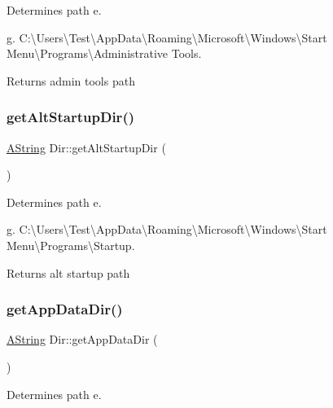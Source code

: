 Determines path e. 

g. C\+:\textbackslash{}\+Users\textbackslash{}\+Test\textbackslash{}\+App\+Data\textbackslash{}\+Roaming\textbackslash{}\+Microsoft\textbackslash{}\+Windows\textbackslash{}\+Start Menu\textbackslash{}\+Programs\textbackslash{}\+Administrative Tools. \begin{DoxyReturn}{Returns}
admin tools path 
\end{DoxyReturn}
\mbox{\label{class_dir_a276a003ff4fb51eb00d854321bd67847}} 
\subsubsection{\texorpdfstring{getAltStartupDir()}{getAltStartupDir()}}
{\footnotesize\ttfamily \mbox{\hyperlink{class_a_string}{A\+String}} Dir\+::get\+Alt\+Startup\+Dir (\begin{DoxyParamCaption}{ }\end{DoxyParamCaption})\hspace{0.3cm}{\ttfamily [static]}}



Determines path e. 

g. C\+:\textbackslash{}\+Users\textbackslash{}\+Test\textbackslash{}\+App\+Data\textbackslash{}\+Roaming\textbackslash{}\+Microsoft\textbackslash{}\+Windows\textbackslash{}\+Start Menu\textbackslash{}\+Programs\textbackslash{}\+Startup. \begin{DoxyReturn}{Returns}
alt startup path 
\end{DoxyReturn}
\mbox{\label{class_dir_a980af97449e70906793e8ff9e22eda35}} 
\subsubsection{\texorpdfstring{getAppDataDir()}{getAppDataDir()}}
{\footnotesize\ttfamily \mbox{\hyperlink{class_a_string}{A\+String}} Dir\+::get\+App\+Data\+Dir (\begin{DoxyParamCaption}{ }\end{DoxyParamCaption})\hspace{0.3cm}{\ttfamily [static]}}



Determines path e. 

